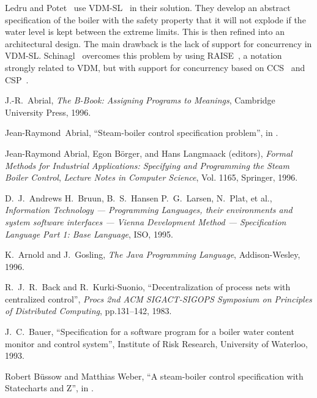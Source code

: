 \documentclass{report}
\begin{document}
Ledru and Potet~\cite{ledru-potet-96} use VDM-SL~\cite{jones-90,
  andrews-bruun-hansen-larsen-plat-95} in their solution.  They
develop an abstract specification of the boiler with the safety
property that it will not explode if the water level is kept between
the extreme limits.  This is then refined into an architectural
design.  The main drawback is the lack of support for concurrency in
VDM-SL.  Schinagl~\cite{schinagl-96} overcomes this problem by using
RAISE~\cite{raise-92}, a notation strongly related to VDM, but with
support for concurrency based on CCS~\cite{milner-89} and
CSP~\cite{hoare-85}.


\begin{thebibliography}{XX}

 J.-R.~Abrial, \emph{The B-Book: Assigning Programs
    to Meanings}, Cambridge University Press, 1996.

 Jean-Raymond~Abrial, ``Steam-boiler control
  specification problem'', in
  \cite[pp.500-510]{abrial-borger-langmaack-96}.

 Jean-Raymond Abrial, Egon
  B\"{o}rger, and Hans Langmaack (editors), \emph{Formal Methods for
  Industrial Applications: Specifying and Programming the Steam Boiler
  Control}, \emph{Lecture Notes in Computer Science}, Vol. 1165,
  Springer, 1996.

 D.~J.~Andrews H.~Bruun,
  B.~S.~Hansen P.~G.~Larsen, N.~Plat, et al., \emph{Information
  Technology --- Programming Languages, their environments and system
  software interfaces --- Vienna Development Method --- Specification
  Language Part 1: Base Language}, ISO, 1995.

 K.~Arnold and J.~Gosling, \emph{The Java
    Programming Language}, Addison-Wesley, 1996.

 R.~J.~R.~Back and R.~Kurki-Suonio,
  ``Decentralization of process nets with centralized control'',
  \emph{Procs 2nd ACM SIGACT-SIGOPS Symposium on Principles of
  Distributed Computing}, pp.131--142, 1983.

 J.~C.~Bauer, ``Specification for a software program
  for a boiler water content monitor and control system'', Institute
  of Risk Research, University of Waterloo, 1993.

 Robert B\"{u}ssow and Matthias Weber, ``A
  steam-boiler control specification with Statecharts and Z'', in
  \cite[pp.109--128]{abrial-borger-langmaack-96}.


\end{thebibliography}
\end{document}
